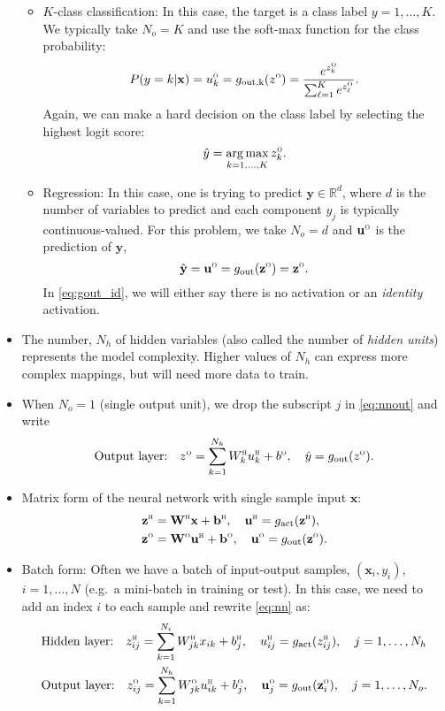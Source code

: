 \documentclass[11pt]{article}
\def\beq{\begin{equation}}
\def\eeq{\end{equation}}
\def\R{{\mathbb{R}}}
\def\argmax{\mathop{\mathrm{arg\,max}}}
\newcommand{\bbf}{\mathbf{b}}
\newcommand{\ubf}{\mathbf{u}}
\newcommand{\xbf}{\mathbf{x}}
\newcommand{\ybf}{\mathbf{y}}
\newcommand{\zbf}{\mathbf{z}}
\newcommand{\Wbf}{\mathbf{W}}
\def\hid{\textsc{\tiny H}}
\def\out{\textsc{\tiny O}}
\begin{document}
\begin{itemize}
\begin{itemize}
\item  $K$-class classification:  In this case,
the target is a class label $y=1,\ldots,K$.  We typically take $N_o = K$ and use the
soft-max function for the class probability:
\beq \label{eq:gout_mc_soft}
    P(y=k|\xbf) = u^\out_k =  g_{\rm out,k}(z^\out) = \frac{e^{z^\out_k}}{\sum_{\ell=1}^K  e^{z^\out_\ell}}.
\eeq
Again, we can make a hard decision on the class label by selecting the highest logit score:
\beq \label{eq:gout_argmax}
    \hat{y} = \argmax_{k=1,\ldots,K} z^\out_k.
\eeq

\item Regression: In this case, one is trying to predict $\ybf \in \R^d$,
where $d$ is the number of variables to predict and each component $y_j$
is typically continuous-valued.  For this problem, we take $N_o=d$ and $\ubf^\out$ is the prediction of $\ybf$,
\beq \label{eq:gout_id}
    \hat{\ybf} = \ubf^\out = g_{\rm out}(\zbf^\out) = \zbf^\out.
\eeq
In \eqref{eq:gout_id}, we will either say there is no activation or an \emph{identity} activation.
\end{itemize}

\item The number, $N_h$ of hidden variables (also called the number of \emph{hidden units})
represents the model complexity.  Higher values of $N_h$ can express more complex mappings,
but will need more data to train.


\item When $N_o=1$ (single output unit), we drop the subscript $j$ in
\eqref{eq:nnout} and write
\beq
    \mbox{Output layer:} \quad
    z^\out = \sum_{k=1}^{N_h} W^\hid_{k}u^\hid_k + b^\out, \quad
    \hat{y} = g_{\rm out}(z^\out).
    \label{eq:nnout_scalar}
\eeq

\item  Matrix form of the neural network with single sample input $\xbf$:
\begin{align*}
    \zbf^\hid &= \Wbf^\hid\xbf + \bbf^\hid, \quad
    \ubf^\hid = g_{\rm act}(\zbf^\hid), \\
    \zbf^\out &= \Wbf^\out\ubf^\hid + \bbf^\out, \quad
    \ubf^\out = g_{\rm out}(\zbf^\out).
\end{align*}

\item Batch form:  Often we have a batch of input-output samples,
$(\xbf_i,y_i)$, $i=1,\ldots,N$ (e.g.\ a mini-batch in training or test).
In this case, we need to add an index $i$
to each sample and rewrite \eqref{eq:nn} as:
\begin{subequations} \label{eq:nnmulti}
\begin{align}
    &\mbox{Hidden layer:} \quad
    z_{ij}^\hid = \sum_{k=1}^{N_i} W^\hid_{jk}x_{ik} + b^\hid_j, \quad
    u_{ij}^\hid = g_{\rm act}(z_{ij}^\hid), \quad j=1,\ldots,N_h
    \label{eq:nnhidden_multi} \\
    &\mbox{Output layer:} \quad
    z_{ij}^\out = \sum_{k=1}^{N_h} W^\out_{jk}u^\hid_{ik} + b^\out_j,
    \quad
    \ubf_j^\out = g_{\rm out}(\zbf_i^\out),
    \quad j=1,\ldots,N_o.
    \label{eq:nnout_multi}
\end{align}
\end{subequations}


\end{itemize}
\end{document}
